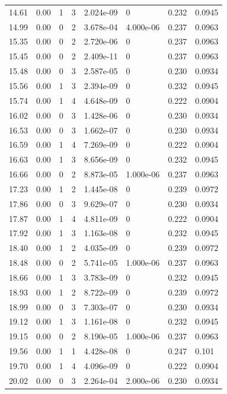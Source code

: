 \documentclass[preview]{standalone}
\begin{document}
{{{\begin{tabular}{L{1.2cm}C{1.2cm} C{0.3cm}C{0.5cm} C{1.4cm}C{1.4cm} C{1.4cm}C{1.4cm}}
  14.61  &  0.00  & 1     &  3 &  2.024e-09  & 0  & 0.232 &  0.0945   \\ 
  14.99  &  0.00  & 0     &  2 &  3.678e-04  & 4.000e-06  & 0.237 &  0.0963   \\ 
  15.35  &  0.00  & 0     &  2 &  2.720e-06  & 0  & 0.237 &  0.0963   \\ 
  15.45  &  0.00  & 0     &  2 &  2.409e-11  & 0  & 0.237 &  0.0963   \\ 
  15.48  &  0.00  & 0     &  3 &  2.587e-05  & 0  & 0.230 &  0.0934   \\ 
  15.56  &  0.00  & 1     &  3 &  2.394e-09  & 0  & 0.232 &  0.0945   \\ 
  15.74  &  0.00  & 1     &  4 &  4.648e-09  & 0  & 0.222 &  0.0904   \\ 
  16.02  &  0.00  & 0     &  3 &  1.428e-06  & 0  & 0.230 &  0.0934   \\ 
  16.53  &  0.00  & 0     &  3 &  1.662e-07  & 0  & 0.230 &  0.0934   \\ 
  16.59  &  0.00  & 1     &  4 &  7.269e-09  & 0  & 0.222 &  0.0904   \\ 
  16.63  &  0.00  & 1     &  3 &  8.656e-09  & 0  & 0.232 &  0.0945   \\ 
  16.66  &  0.00  & 0     &  2 &  8.873e-05  & 1.000e-06  & 0.237 &  0.0963   \\ 
  17.23  &  0.00  & 1     &  2 &  1.445e-08  & 0  & 0.239 &  0.0972   \\ 
  17.86  &  0.00  & 0     &  3 &  9.629e-07  & 0  & 0.230 &  0.0934   \\ 
  17.87  &  0.00  & 1     &  4 &  4.811e-09  & 0  & 0.222 &  0.0904   \\ 
  17.92  &  0.00  & 1     &  3 &  1.163e-08  & 0  & 0.232 &  0.0945   \\ 
  18.40  &  0.00  & 1     &  2 &  4.035e-09  & 0  & 0.239 &  0.0972   \\ 
  18.48  &  0.00  & 0     &  2 &  5.741e-05  & 1.000e-06  & 0.237 &  0.0963   \\ 
  18.66  &  0.00  & 1     &  3 &  3.783e-09  & 0  & 0.232 &  0.0945   \\ 
  18.93  &  0.00  & 1     &  2 &  8.722e-09  & 0  & 0.239 &  0.0972   \\ 
  18.99  &  0.00  & 0     &  3 &  7.303e-07  & 0  & 0.230 &  0.0934   \\ 
  19.12  &  0.00  & 1     &  3 &  1.161e-08  & 0  & 0.232 &  0.0945   \\ 
  19.15  &  0.00  & 0     &  2 &  8.190e-05  & 1.000e-06  & 0.237 &  0.0963   \\ 
  19.56  &  0.00  & 1     &  1 &  4.428e-08  & 0  & 0.247 &  0.101   \\ 
  19.70  &  0.00  & 1     &  4 &  4.096e-09  & 0  & 0.222 &  0.0904   \\ 
  20.02  &  0.00  & 0     &  3 &  2.264e-04  & 2.000e-06  & 0.230 &  0.0934   \\ 
\hline 
\end{tabular} 

}}}
\end{document}
